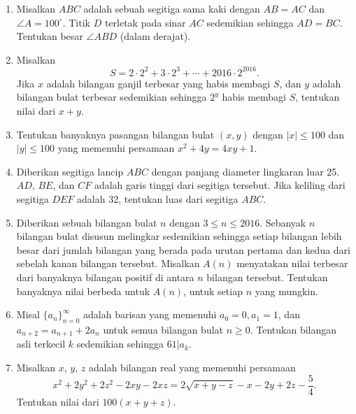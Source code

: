 \documentclass[a4paper,12pt]{article}
\begin{document}
\begin{enumerate}
\item Misalkan $ABC$ adalah sebuah segitiga sama kaki dengan $AB=AC$ dan $\angle A=100^\circ$. Titik $D$ terletak pada sinar $AC$ sedemikian sehingga $AD=BC$. Tentukan besar $\angle ABD$ (dalam derajat).

\item Misalkan $$S = 2 \cdot 2^2 + 3 \cdot 2^3 + \cdots + 2016 \cdot 2^{2016}.$$ Jika $x$ adalah bilangan ganjil terbesar yang habis membagi $S$, dan $y$ adalah bilangan bulat terbesar sedemikian sehingga $2^y$ habis membagi $S$, tentukan nilai dari $x + y$.

\item Tentukan banyaknya pasangan bilangan bulat $(x,y)$ dengan $|x|\leq 100$ dan $|y|\leq 100$ yang memenuhi persamaan $x^2+4y=4xy+1$.

\item Diberikan segitiga lancip $ABC$ dengan panjang diameter lingkaran luar 25. $AD$, $BE$, dan $CF$ adalah garis tinggi dari segitiga tersebut. Jika keliling dari segitiga $DEF$ adalah 32, tentukan luas dari segitiga $ABC$.

\item Diberikan sebuah bilangan bulat $n$ dengan $3 \le n \le 2016$. Sebanyak $n$ bilangan bulat disusun melingkar sedemikian sehingga setiap bilangan lebih besar dari jumlah bilangan yang berada pada urutan pertama dan kedua dari sebelah kanan bilangan tersebut. Misalkan $A(n)$ menyatakan nilai terbesar dari banyaknya bilangan positif di antara $n$ bilangan tersebut. Tentukan banyaknya nilai berbeda untuk $A(n)$, untuk setiap $n$ yang mungkin.

\item Misal $\{a_n\}_{n=0}^{\infty}$ adalah barisan yang memenuhi $a_0 = 0, a_1 = 1$, dan $a_{n+2} = a_{n+1}+2a_n$ untuk semua bilangan bulat $n \geq 0$. Tentukan bilangan asli terkecil $k$ sedemikian sehingga $61 | a_k$.

\item Misalkan $x$, $y$, $z$ adalah bilangan real yang memenuhi persamaan \[x^2+2y^2+2z^2-2xy-2xz=2\sqrt{x+y-z}-x-2y+2z-\frac{5}{4}.\] Tentukan nilai dari $100(x+y+z)$.
\end{enumerate}

\newpage
\end{document}
